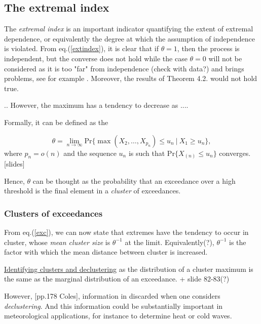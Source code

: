 \subsection{The extremal index}
The \emph{extremal index} is an important indicator quantifying the extent of extremal dependence, or equivalently the degree at which the assumption of independence is violated. From eq.(\ref{extindex}), it is clear that if  $\theta=1$, then the process is independent, but the converse does not hold while the case $\theta= 0$ will not be considered as it is too "far" from independence (check with data?) and brings problems, see for example \citet[pp.379-380]{beirlant_statistics_2006}. Moreover, the results of Theorem 4.2. would not hold true.

.. However, the maximum has a tendency to decrease as .... \cite[pp.96]{coles_introduction_2001}

Formally, it can be defined as the 

\begin{equation}\label{exc}
\theta=\displaystyle{\lim_{n \to \infty}}\text{Pr}\big\{\max(X_2,\dots,X_{p_n})\leq u_n\ | \ X_1\geq u_n\big\},
\end{equation}
where $p_n=o(n)$ and the sequence $u_n$ is such that Pr$\big\{X_{(n)} \leq u_n\big\}$ converges. \cite{coles_introduction_2001}[slides]

Hence, $\theta$ can be thought as the probability that an exceedance over a high threshold is the final element in a \emph{cluster }of exceedances.

\subsubsection*{Clusters of exceedances} From eq.(\ref{exc}), we can now state that extremes have the tendency to occur in cluster, whose \emph{mean cluster size} is $\theta^{-1}$ at the limit. Equivalently(?), $\theta^{-1}$ is the factor with which the mean distance between cluster is increased.

\underline{Identifying clusters and declustering} as the distribution of a cluster maximum is the same as the marginal distribution of an
exceedance.
+ slide 82-83(?)

However, [pp.178 Coles], information in discarded when one considers \emph{declustering}. And this information could be substantially important in meteorological applications, for instance to determine heat or cold waves.



